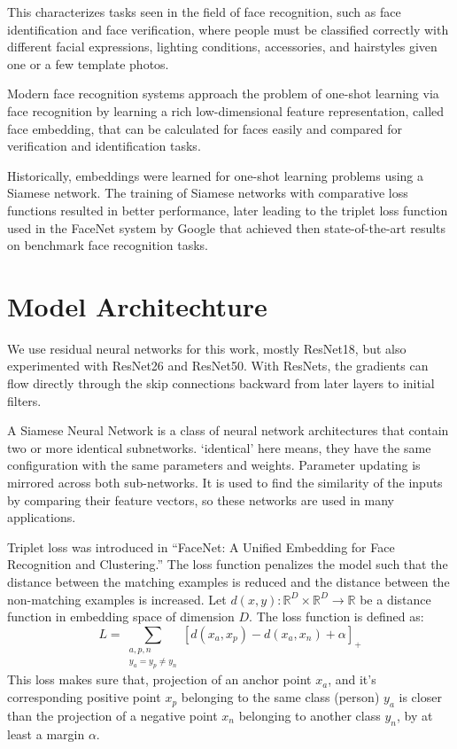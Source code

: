 \documentclass[
12pt,
tightenlines,
aps,
prb,
twocolumn,
superscriptaddress,
longbibliography,
floatfix
]{revtex4-2}
\newif\ifptitle
\newif\ifpnumber
\newcounter{para}
\newcommand\ptitle[1]{\par\refstepcounter{para}
{\ifpnumber{\noindent\textcolor{lightgray}{\textbf{\thepara}}\indent}\fi}
{\ifptitle{\textbf{[{#1}]}}\fi}}
\begin{document}
This characterizes tasks seen in the field of face recognition, such as face identification and face verification, where people must be classified correctly with different facial expressions, lighting conditions, accessories, and hairstyles given one or a few template photos.

Modern face recognition systems approach the problem of one-shot learning via face recognition by learning a rich low-dimensional feature representation, called face embedding, that can be calculated for faces easily and compared for verification and identification tasks.

Historically, embeddings were learned for one-shot learning problems using a Siamese network. The training of Siamese networks with comparative loss functions resulted in better performance, later leading to the triplet loss function used in the FaceNet system by Google that achieved then state-of-the-art results on benchmark face recognition tasks.
\vspace{-5mm}

\section{\label{sec:Model}Model Architechture}
\ptitle{ResNet} We use residual neural networks for this work, mostly ResNet18, but also experimented with ResNet26 and ResNet50. With ResNets, the gradients can flow directly through the skip connections backward from later layers to initial filters.

\ptitle{Siamese Network} A Siamese Neural Network is a class of neural network architectures that contain two or more identical subnetworks. ‘identical’ here means, they have the same configuration with the same parameters and weights. Parameter updating is mirrored across both sub-networks. It is used to find the similarity of the inputs by comparing their feature vectors, so these networks are used in many applications.

\ptitle{Triplet Loss} Triplet loss was introduced in “FaceNet: A Unified Embedding for Face Recognition and Clustering.”
The loss function penalizes the model such that the distance between the matching examples is reduced and the distance between the non-matching examples is increased. Let $d(x,y) : \mathbb{R}^D \times \mathbb{R}^D \rightarrow \mathbb{R}$ be a distance function in embedding space of dimension $D$. The loss function is defined as:
\begin{equation}
L = \sum_{\substack{a,p,n \\ y_a = y_p \neq y_n}} [d(x_a, x_p) - d(x_a, x_n) + \alpha]_+
\label{eqn:tripletloss}
\end{equation}
 This loss makes sure that, projection of an anchor point $x_a$, and it's corresponding positive point $x_p$ belonging to the same class (person) $y_a$ is closer than the projection of a negative point $x_n$ belonging to another class $y_n$, by at least a margin $\alpha$.
\end{document}
